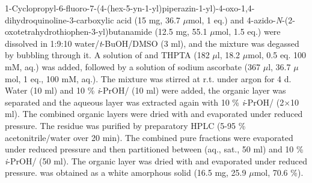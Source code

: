 1-Cyclopropyl-6-fluoro-7-(4-(hex-5-yn-1-yl)piperazin-1-yl)-4-oxo-1,4\hyp{}dihydro\-quinoline-3-carboxylic acid  (15 mg, 36.7 $\mu$mol, 1 eq.) and 
4\hyp{}azido\hyp{}\textit{N}\hyp{}(2\hyp{}oxotetrahydrothiophen\hyp{}3\hyp{}yl)butanamide  (12.5 mg, 55.1 $\mu$mol, 1.5 eq.) 
were dissolved in 1:9:10 water/\textit{t}-BuOH/DMSO (3 ml), and the mixture was degassed by bubbling  through it. 
A solution of  and THPTA (182 $\mu$l, 18.2 $\mu$mol, 0.5 eq. 100 mM, aq.) was added, followed by a solution of sodium ascorbate (367 $\mu$l, 36.7 $\mu$mol, 1 eq., 100 mM, aq.). 
The mixture was stirred at r.t. under argon for 4 d. Water (10 ml) and 10 \% \textit{i}-PrOH/ (10 ml) were added, the organic layer was separated and the aqueous layer was extracted again with 10 \% \textit{i}-PrOH/ (2$\times$10 ml). The combined organic layers were dried with  and evaporated under reduced pressure. The residue was purified by preparatory HPLC (5-95 \% acetonitrile/water over 20 min). 
The combined pure fractions were evaporated under reduced pressure and then partitioned between  (aq., sat., 50 ml) and 10 \% \textit{i}-PrOH/ (50 ml). The organic layer was dried with  and evaporated under reduced pressure.
 was obtained as a white amorphous solid (16.5 mg, 25.9 $\mu$mol, 70.6 \%).
\\[1\baselineskip]
\\[1\baselineskip]
